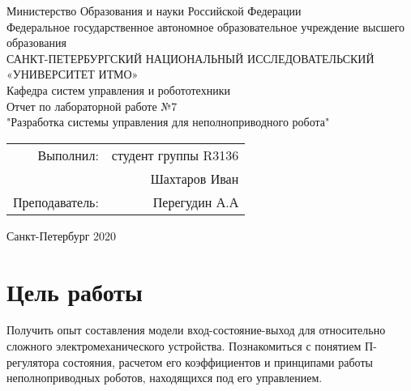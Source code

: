 \documentclass[a4paper]{article}
\begin{document}
 
\begin{center}
\hfill \break
\normalsize{Министерство Образования и науки Российской Федерации}\\
\hfill \break
\normalsize{Федеральное государственное автономное образовательное учреждение высшего образования}\\ 
\hfill \break
\normalsize{САНКТ-ПЕТЕРБУРГСКИЙ НАЦИОНАЛЬНЫЙ ИССЛЕДОВАТЕЛЬСКИЙ}\\
\normalsize{«УНИВЕРСИТЕТ ИТМО»}\\
\hfill \break
\hfill \break
\hfill \break
\hfill \break
 \hfill \break
\normalsize{Кафедра систем управления и робототехники}\\
\hfill\break
\hfill \break
\hfill \break
\hfill \break
\normalsize{Отчет по лабораторной работе №7}\\
\normalsize{"Разработка системы управления для неполноприводного робота"\ }\\
\hfill \break
\hfill \break
\hfill \break
\hfill \break
\hfill \break
\begin{flushright}
   \begin{tabular}{r r}
   Выполнил: &  студент группы R3136\\
  & Шахтаров Иван\\
  Преподаватель: & Перегудин А.А\\
  \end{tabular}
\end{flushright}
 \hfill \break
\hfill \break
\hfill \break
\hfill \break
\hfill \break
\hfill \break
\hfill \break
\hfill \break
\hfill \break
\hfill \break
\end{center}
\begin{center} Санкт-Петербург 2020\end{center}
\thispagestyle{empty} %
 

\newpage
\section{Цель работы}
\begin{flushleft}
Получить опыт составления модели вход-состояние-выход для относительно сложного электромеханического устройства. Познакомиться с понятием П-регулятора состояния, расчетом его коэффициентов и принципами работы неполноприводных роботов, находящихся под его управлением.    
\end{flushleft}
\end{document}
